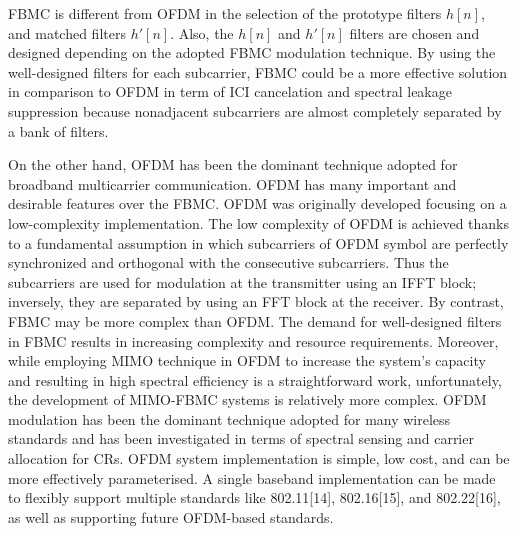 \documentclass{article}
\begin{document}
FBMC is different from OFDM in the selection of the prototype filters $h[n]$, and matched filters $h'[n]$. Also, the $h[n]$ and $h'[n]$ filters are chosen and designed depending on the adopted FBMC modulation technique.
By using the well-designed filters for each subcarrier, FBMC could be a more effective solution in comparison to OFDM in term of ICI cancelation and spectral leakage suppression because nonadjacent subcarriers are almost completely separated by a bank of filters. 

On the other hand, OFDM has been the dominant technique adopted for broadband multicarrier communication.
OFDM has many important and desirable features over the FBMC. OFDM was originally developed focusing on a low-complexity implementation. The low complexity of OFDM is achieved thanks to a fundamental assumption in which subcarriers of OFDM symbol are perfectly synchronized and orthogonal with the consecutive subcarriers. Thus the subcarriers are used for modulation at the transmitter using an IFFT block; inversely, they are separated by using an FFT block at the receiver. By contrast, FBMC may be more complex than OFDM. The demand for well-designed filters in FBMC results in increasing complexity and resource requirements. Moreover, while employing MIMO technique in OFDM to increase the system's capacity and resulting in high spectral efficiency is a straightforward work, unfortunately, the development of MIMO-FBMC systems is relatively more complex.
OFDM modulation has been the dominant technique adopted for many wireless standards and has been investigated in terms of spectral sensing and carrier allocation for CRs.
OFDM system implementation is simple, low cost, and can be more effectively parameterised.
A single baseband implementation can be made to flexibly support multiple standards like 802.11[14], 802.16[15], and 802.22[16], as well as supporting future OFDM-based standards.
\end{document}
